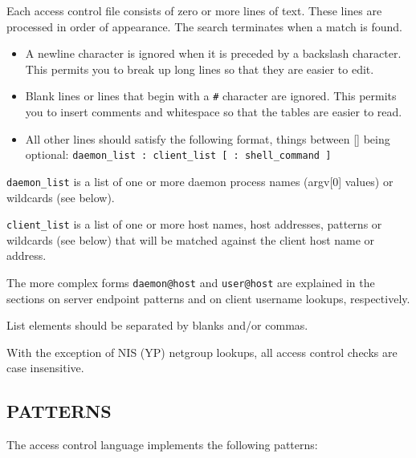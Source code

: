 \documentclass[11pt,twoside,onecolumn]{book}
\begin{document}
Each access control file consists of zero or more lines of text.  These
lines are processed in order of appearance. The search terminates when a
match is found.

\begin{itemize}

\item A newline character is ignored when it is preceded by a backslash
character. This permits you to break up long lines so that they are
easier to edit.

\item Blank lines or lines that begin with a {\tt \#} character are ignored.
This permits you to insert comments and whitespace so that the tables
are easier to read.

\item All other lines should satisfy the following format, things between []
being optional: {\tt daemon\_list : client\_list [ : shell\_command ] }

\end{itemize}

{\tt daemon\_list} is a list of one or more daemon process names
(argv[0] values) or wildcards (see below).  

{\tt client\_list} is a list
of one or more host names, host addresses, patterns or wildcards (see
below) that will be matched against the client host name or address.

The more complex forms {\tt daemon@host} and {\tt user@host} are
explained in the sections on server endpoint patterns and on client
username lookups, respectively.

List elements should be separated by blanks and/or commas.  

With the exception of NIS (YP) netgroup lookups, all access control
checks are case insensitive.

\subsection*{PATTERNS}

The access control language implements the following patterns:
\end{document}
